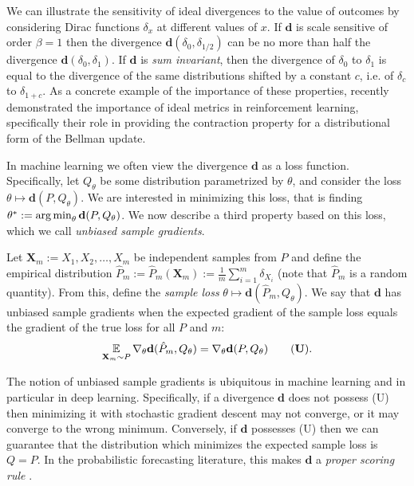 \documentclass{article}
\def \dive {\mathbf{d}}
\def \Qtheta {Q_\theta}
\def \gradtheta {{\grad_\theta}}
\def \batch {\mathbf{X}_m}
\begin{document}
%
We can illustrate the sensitivity of ideal divergences to the value of outcomes by considering Dirac functions $\delta_x$ at different values of $x$. If $\dive$ is scale sensitive of order $\beta = 1$ then the divergence $\dive(\delta_0, \delta_{1/2})$ can be no more than half the divergence $\dive(\delta_0, \delta_1)$. If $\dive$ is \emph{sum invariant}, then the divergence of $\delta_0$ to $\delta_{1}$ is equal to the divergence of the same distributions shifted by a constant $c$, i.e. of $\delta_{c}$ to $\delta_{1 + c}$. 
%
As a concrete example of the importance of these properties, \citet{bellemare17distributional} recently demonstrated the importance of ideal metrics in reinforcement learning, specifically their role in providing the contraction property for a distributional form of the Bellman update.

In machine learning we often view the divergence $\dive$ as a loss function. Specifically, let $Q_\theta$ be some distribution parametrized by $\theta$, and consider the loss $\theta \mapsto \dive(P, \Qtheta)$. We are interested in minimizing this loss, that is finding $\theta^* := \argmin_\theta \dive(P, Q_\theta)$. We now describe a third property based on this loss, which we call \emph{unbiased sample gradients}.

Let $\batch := X_1, X_2, \dots, X_m$ be independent samples from $P$ and define the empirical distribution $\hat P_m := \hat P_m(\batch) := \tfrac{1}{m} \sum_{i=1}^m \delta_{X_i}$ (note that $\hat P_m$ is a random quantity). From this, define the \emph{sample loss} $\theta \mapsto \dive(\hat P_m, \Qtheta)$. We say that $\dive$ has unbiased sample gradients when the expected gradient of the sample loss equals the gradient of the true loss for all $P$ and $m$:
\begin{equation}
\expect_{\batch \sim P} \gradtheta \dive(\hat P_m, \Qtheta) = \gradtheta \dive(P, \Qtheta) \tag{\textbf{U}} .
\label{eqn:unbiased_sample_gradients}
\end{equation}

The notion of unbiased sample gradients is ubiquitous in machine learning and in particular in deep learning. Specifically, if a divergence $\dive$ does not possess (U) then minimizing it with stochastic gradient descent may not converge, or it may converge to the wrong minimum. Conversely, if $\dive$ possesses (U) then we can guarantee that the distribution which minimizes the expected sample loss
is $Q = P$.
In the probabilistic forecasting literature, this makes $\dive$ a \emph{proper scoring rule} \citep{gneiting07strictly}.
%
%
\end{document}
